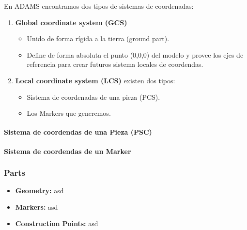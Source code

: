         En ADAMS encontramos dos tipos de sistemas de coordenadas:
        
        \begin{enumerate}
            \item \textbf{Global coordinate system (GCS) }
            \begin{itemize}
                \item Unido de forma rígida a la tierra (ground part).
                \item Define de forma absoluta el punto (0,0,0) del modelo y provee los ejes de referencia para crear futuros sistema locales de coordendas.
            \end{itemize}
            \item \textbf{Local coordinate system (LCS)} existen dos tipos:
            \begin{itemize}
                \item Sistema de coordenadas de una pieza (PCS).
                \item Los Markers que generemos.
            \end{itemize}
        \end{enumerate}
        
        \paragraph{Sistema de coordendas de una Pieza (PSC)}
        \paragraph{Sistema de coordendas de un Marker}
        
        \subsubsection{Parts}
        
        \begin{itemize}
            \item \textbf{Geometry:} asd
            \item \textbf{Markers:} asd
            \item \textbf{Construction Points:} asd
        \end{itemize}

